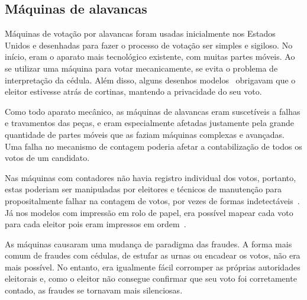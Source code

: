 \subsection{Máquinas de alavancas}

Máquinas de votação por alavancas foram usadas inicialmente nos Estados Unidos e desenhadas para fazer o processo de votação ser simples e sigiloso. No início, eram o aparato mais tecnológico existente, com muitas partes móveis. Ao se utilizar uma máquina para votar mecanicamente, se evita o problema de interpretação da cédula. Além disso, alguns desenhos modelos~\nocite{gillespie1899voting} obrigavam que o eleitor estivesse atrás de cortinas, mantendo a privacidade do seu voto.

Como todo aparato mecânico, as máquinas de alavancas eram suscetíveis a falhas e travamentos das peças, e eram especialmente afetadas justamente pela grande quantidade de partes móveis que as faziam máquinas complexas e avançadas. Uma falha no mecanismo de contagem poderia afetar a contabilização de todos os votos de um candidato.

Nas máquinas com contadores não havia registro individual dos votos, portanto, estas poderiam ser manipuladas por eleitores e técnicos de manutenção para propositalmente falhar na contagem de votos, por vezes de formas indetectáveis~\cite[p.~42-45]{jones2012broken}. Já nos modelos com impressão em rolo de papel, era possível mapear cada voto para cada eleitor pois eram impressos em ordem~\cite[p.~26]{jones2012broken}.

As máquinas causaram uma mudança de paradigma das fraudes. A forma mais comum de fraudes com cédulas, de estufar as urnas ou encadear os votos, não era mais possível. No entanto, era igualmente fácil corromper as próprias autoridades eleitorais e, como o eleitor não consegue confirmar que seu voto foi corretamente contado, as fraudes se tornavam mais silenciosas.